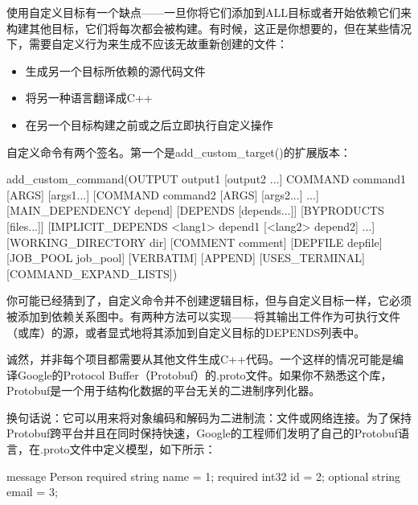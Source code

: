 
使用自定义目标有一个缺点——一旦你将它们添加到ALL目标或者开始依赖它们来构建其他目标，它们将每次都会被构建。有时候，这正是你想要的，但在某些情况下，需要自定义行为来生成不应该无故重新创建的文件：

\begin{itemize}
\item
生成另一个目标所依赖的源代码文件

\item
将另一种语言翻译成C++

\item
在另一个目标构建之前或之后立即执行自定义操作
\end{itemize}

自定义命令有两个签名。第一个是add\_custom\_target()的扩展版本：

\begin{shell}
add_custom_command(OUTPUT output1 [output2 ...]
                   COMMAND command1 [ARGS] [args1...]
                   [COMMAND command2 [ARGS] [args2...] ...]
                   [MAIN_DEPENDENCY depend]
                   [DEPENDS [depends...]]
                   [BYPRODUCTS [files...]]
                   [IMPLICIT_DEPENDS <lang1> depend1
                                    [<lang2> depend2] ...]
                   [WORKING_DIRECTORY dir]
                   [COMMENT comment]
                   [DEPFILE depfile]
                   [JOB_POOL job_pool]
                   [VERBATIM] [APPEND] [USES_TERMINAL]
                   [COMMAND_EXPAND_LISTS])
\end{shell}

你可能已经猜到了，自定义命令并不创建逻辑目标，但与自定义目标一样，它必须被添加到依赖关系图中。有两种方法可以实现——将其输出工件作为可执行文件（或库）的源，或者显式地将其添加到自定义目标的DEPENDS列表中。


诚然，并非每个项目都需要从其他文件生成C++代码。一个这样的情况可能是编译Google的Protocol Buffer（Protobuf）的.proto文件。如果你不熟悉这个库，Protobuf是一个用于结构化数据的平台无关的二进制序列化器。

换句话说：它可以用来将对象编码和解码为二进制流：文件或网络连接。为了保持Protobuf跨平台并且在同时保持快速，Google的工程师们发明了自己的Protobuf语言，在.proto文件中定义模型，如下所示：

\begin{shell}
message Person {
    required string name = 1;
    required int32 id = 2;
    optional string email = 3;
}
\end{shell}

